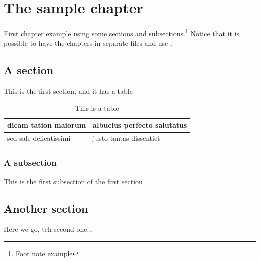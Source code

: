 \chapter{The sample chapter}
First chapter example using some sections and subsections.\footnote{Foot note example} Notice that it is possible to have the chapters in separate files and use  \verb++.


\section{A section}
This is the first section, and it has a table

\begin{table}[h]
    \centering
    \begin{tabular}{|l|l|}
     \hline
        dicam tation maiorum & albucius perfecto salutatus \\ \hline
        sed sale delicatissimi & justo tantas dissentiet \\ \hline        
    \end{tabular}
    \caption{This is a table}

\end{table}

\subsection{A subsection}
This is the first subsection of the first section

\section{Another section}
Here we go, teh second one... 


